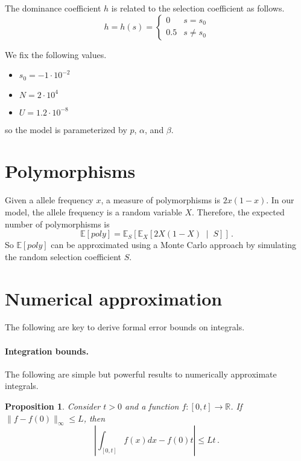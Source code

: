 \documentclass[a4paper,11pt]{article}
\makeatletter
\newcommand{\EE}{\mathbb{E}}
\newcommand{\RR}{\mathbb{R}}
\newcommand{\1}{\mathds{1}}
\newcommand{\cond}{\;\middle\vert\;}
\theoremstyle{plain} %
\newtheorem{Proposition}[@theorem]{Proposition}
\theoremstyle{definition} %
\theoremstyle{remark} %
\makeatother
\begin{document}
The dominance coefficient $h$ is related to the selection coefficient as follows.
\[
	h = h(s) = \begin{cases}
		0
			& s = s_0 \\
		0.5
			& s \not = s_0
	\end{cases}
\]

We fix the following values.
\begin{itemize}
	\item $s_0 = - 1 \cdot 10^{-2}$ 
	\item $N = 2 \cdot 10^{4}$
	\item $U = 1.2 \cdot 10^{-8}$
\end{itemize}
so the model is parameterized by $p$, $\alpha$, and $\beta$.



\section{Polymorphisms}

Given a allele frequency $x$, a measure of polymorphisms is $2 x (1 - x)$. 
In our model, the allele frequency is a random variable $X$.
Therefore, the expected number of polymorphisms is 
\[
	\EE[poly] = \EE_{S} \left[ \EE_X \left[ 2 X (1 - X) \cond S \right] \right] \,.
\]
So $\EE[poly]$ can be approximated using a Monte Carlo approach by simulating the random selection coefficient $S$.








\section{Numerical approximation}

The following are key to derive formal error bounds on integrals.

\paragraph{Integration bounds.}
The following are simple but powerful results to numerically approximate integrals.

\begin{Proposition}
\label{Result: Square approximation}
	Consider $t > 0$ and a function $f \colon [0, t] \to \RR$.
	If $\| f - f(0)\|_\infty \le L$, then
	\[
		\left| \int_{[0, t]} f(x) dx - f(0) t \right| \le L t \,.
	\]
\end{Proposition}
\end{document}
